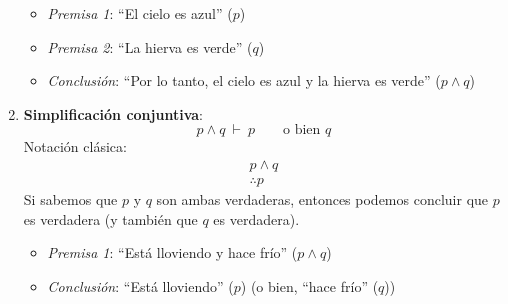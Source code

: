 \begin{enumerate}[label=\alph*)]
	\begin{fmd-example}[Adjunción]
		\begin{itemize}
			\item \textit{Premisa 1}: ``El cielo es azul'' ($p$)
			\item \textit{Premisa 2}: ``La hierva es verde'' ($q$)
			\item \textit{Conclusión}: ``Por lo tanto, el cielo es azul y la hierva es verde'' ($p \land q$)
		\end{itemize}
	\end{fmd-example}
	
	\item \textbf{Simplificación conjuntiva}:
	\[ p \land q \ \vdash \ p \qquad \text{o bien } q \]
	Notación clásica:
	\[
	\begin{array}{l}
		p \land q\\ \hline
		\therefore p
	\end{array}
	\]
	Si sabemos que \(p\) y \(q\) son ambas verdaderas, entonces podemos concluir que \(p\) es verdadera (y también que \(q\) es verdadera).
	\begin{fmd-example}
		\begin{itemize}
			\item \textit{Premisa 1}: ``Está lloviendo y hace frío'' ($p \land q$)
			\item \textit{Conclusión}: ``Está lloviendo'' ($p$) (o bien, ``hace frío'' ($q$))
		\end{itemize}
	\end{fmd-example}
\end{enumerate}

